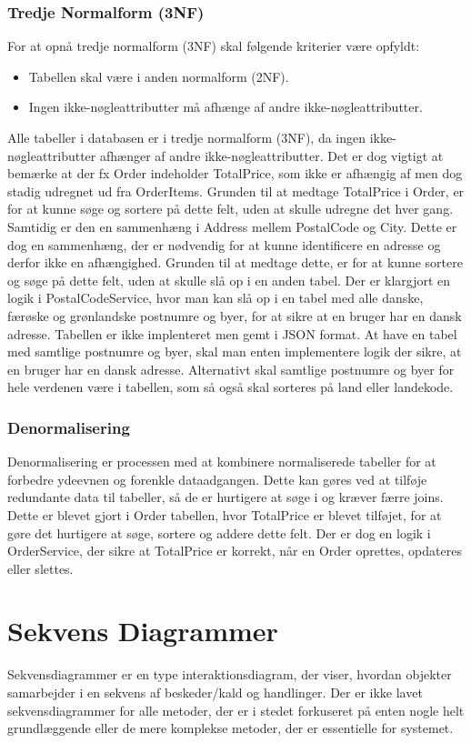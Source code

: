 \subsubsection{Tredje Normalform (3NF)}
For at opnå tredje normalform (3NF) skal følgende kriterier være opfyldt:
\begin{itemize}
    \item Tabellen skal være i anden normalform (2NF).
    \item Ingen ikke-nøgleattributter må afhænge af andre ikke-nøgleattributter.
\end{itemize}
Alle tabeller i databasen er i tredje normalform (3NF), da ingen ikke-nøgleattributter afhænger af andre ikke-nøgleattributter.
Det er dog vigtigt at bemærke at der fx Order indeholder TotalPrice, som ikke er afhængig af men dog stadig udregnet ud fra OrderItems.
Grunden til at medtage TotalPrice i Order, er for at kunne søge og sortere på dette felt, uden at skulle udregne det hver gang.
Samtidig er den en sammenhæng i Address mellem PostalCode og City. Dette er dog en sammenhæng, der er nødvendig for at kunne identificere en adresse og derfor ikke en afhængighed.
Grunden til at medtage dette, er for at kunne sortere og søge på dette felt, uden at skulle slå op i en anden tabel.
Der er klargjort en logik i PostalCodeService, hvor man kan slå op i en tabel med alle danske, færøske og grønlandske postnumre og byer, for at sikre at en bruger har en dansk adresse.
Tabellen er ikke implenteret men gemt i JSON format. At have en tabel med samtlige postnumre og byer, skal man enten implementere logik der sikre, at en bruger har en dansk adresse. 
Alternativt skal samtlige postnumre og byer for hele verdenen være i tabellen, som så også skal sorteres på land eller landekode.

\subsubsection{Denormalisering}
Denormalisering er processen med at kombinere normaliserede tabeller for at forbedre ydeevnen og forenkle dataadgangen. 
Dette kan gøres ved at tilføje redundante data til tabeller, så de er hurtigere at søge i og kræver færre joins.
Dette er blevet gjort i Order tabellen, hvor TotalPrice er blevet tilføjet, for at gøre det hurtigere at søge, sortere og addere dette felt.
Der er dog en logik i OrderService, der sikre at TotalPrice er korrekt, når en Order oprettes, opdateres eller slettes.

\section{Sekvens Diagrammer}
\label{sec:sekvens-diagrammer}
Sekvensdiagrammer er en type interaktionsdiagram, der viser, hvordan objekter samarbejder i en sekvens af beskeder/kald og handlinger.
Der er ikke lavet sekvensdiagrammer for alle metoder, der er i stedet forkuseret på enten nogle helt grundlæggende eller de mere komplekse metoder, der er essentielle for systemet.

